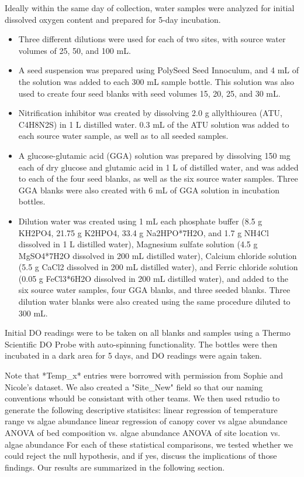 \documentclass{article}\usepackage[]{graphicx}\usepackage[]{color}
\begin{document}
Ideally within the same day of collection, water samples were analyzed for initial dissolved oxygen content and prepared for 5-day incubation.  
\begin{itemize}
  \item Three different dilutions were used for each of two sites, with source water volumes of 25, 50, and 100 mL. 
  \item A seed suspension was prepared using PolySeed Seed Innoculum, and 4 mL of the solution was added to each 300 mL sample bottle. This solution was also used to create four seed blanks with seed volumes 15, 20, 25, and 30 mL.
  \item Nitrification inhibitor was created by dissolving 2.0 g allylthiourea (ATU, C4H8N2S) in 1 L distilled water. 0.3 mL of the ATU solution was added to each source water sample, as well as to all seeded samples. 
  \item A glucose-glutamic acid (GGA) solution was prepared by dissolving 150 mg each of dry glucose and glutamic acid in 1 L of distilled water, and was added to each of the four seed blanks, as well as the six source water samples. Three GGA blanks were also created with 6 mL of GGA solution in incubation bottles. 
  \item Dilution water was created using 1 mL each phosphate buffer (8.5 g KH2PO4, 21.75 g K2HPO4, 33.4 g Na2HPO*7H2O, and 1.7 g NH4Cl dissolved in 1 L distilled water), Magnesium sulfate solution (4.5 g MgSO4*7H2O dissolved in 200 mL distilled water), Calcium chloride solution (5.5 g CaCl2 dissolved in 200 mL distilled water), and Ferric chloride solution (0.05 g FeCl3*6H2O dissolved in 200 mL distilled water), and added to the six source water samples, four GGA blanks, and three seeded blanks. Three dilution water blanks were also created using the same procedure diluted to 300 mL.
\end{itemize}
Initial DO readings were to be taken on all blanks and samples using a Thermo Scientific DO Probe with auto-spinning functionality. The bottles were then incubated in a dark area for 5 days, and DO readings were again taken.  

Note that *Temp\_x* entries were borrowed with permission from Sophie and Nicole's dataset. We also created a "Site\_New" field so that our naming conventions whould be consistant with other teams. We then used rstudio to generate the following descriptive statisitcs:  
linear regression of temperature range vs algae abundance
linear regression of canopy cover vs algae abundance
ANOVA of bed composition vs. algae abundance
ANOVA of site location vs. algae abundance
For each of these statistical comparisons, we tested whether we could reject the null hypothesis, and if yes, discuss the implications of those findings. Our results are summarized in the following section. 
\end{document}
